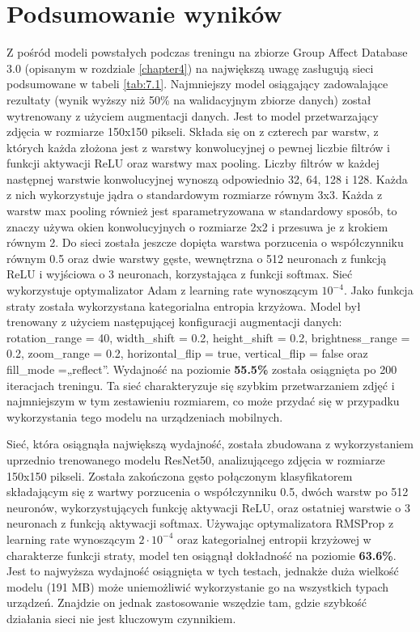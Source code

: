 \section{Podsumowanie wyników}
Z pośród modeli powstałych podczas treningu na zbiorze Group Affect Database 3.0 (opisanym w rozdziale \ref{chapter4}) na największą uwagę zasługują sieci podsumowane w tabeli \ref{tab:7.1}. Najmniejszy model osiągający zadowalające rezultaty (wynik wyższy niż 50\% na walidacyjnym zbiorze danych) został wytrenowany z użyciem augmentacji danych. Jest to model przetwarzający zdjęcia w rozmiarze 150x150 pikseli. Składa się on z czterech par warstw, z których każda złożona jest z warstwy konwolucyjnej o pewnej liczbie filtrów i funkcji aktywacji ReLU oraz warstwy max pooling. Liczby filtrów w każdej następnej warstwie konwolucyjnej wynoszą odpowiednio 32, 64, 128 i 128. Każda z nich wykorzystuje jądra o standardowym rozmiarze równym 3x3. Każda z warstw max pooling również jest sparametryzowana w standardowy sposób, to znaczy używa okien konwolucyjnych o rozmiarze 2x2 i przesuwa je z krokiem równym 2. Do sieci została jeszcze dopięta warstwa porzucenia o współczynniku równym 0.5 oraz dwie warstwy gęste, wewnętrzna o 512 neuronach z funkcją ReLU i wyjściowa o 3 neuronach, korzystająca z funkcji softmax. Sieć wykorzystuje optymalizator Adam z learning rate wynoszącym $10^{-4}$. Jako funkcja straty została wykorzystana kategorialna entropia krzyżowa. Model był trenowany z użyciem następującej konfiguracji augmentacji danych: rotation\_range = 40, width\_shift = 0.2, height\_shift = 0.2, brightness\_range = 0.2, zoom\_range = 0.2, horizontal\_flip = true, vertical\_flip = false oraz fill\_mode =„reflect”. Wydajność na poziomie \textbf{55.5\%} została osiągnięta po 200 iteracjach treningu. Ta sieć charakteryzuje się szybkim przetwarzaniem zdjęć i najmniejszym w tym zestawieniu rozmiarem, co może przydać się w przypadku wykorzystania tego modelu na urządzeniach mobilnych.

Sieć, która osiągnąła największą wydajność, została zbudowana z wykorzystaniem uprzednio trenowanego modelu ResNet50, analizującego zdjęcia w rozmiarze 150x150 pikseli. Została zakończona gęsto połączonym klasyfikatorem składającym się z wartwy porzucenia o współczynniku 0.5, dwóch warstw po 512 neuronów, wykorzystujących funkcję aktywacji ReLU, oraz ostatniej warstwie o 3 neuronach z funkcją aktywacji softmax. Używając optymalizatora RMSProp z learning rate wynoszącym $2\cdot10^{-4}$ oraz kategorialnej entropii krzyżowej w charakterze funkcji straty, model ten osiągnął dokładność na poziomie \textbf{63.6\%}. Jest to najwyższa wydajność osiągnięta w tych testach, jednakże duża wielkość modelu (191 MB) może uniemożliwić wykorzystanie go na wszystkich typach urządzeń. Znajdzie on jednak zastosowanie wszędzie tam, gdzie szybkość działania sieci nie jest kluczowym czynnikiem.

